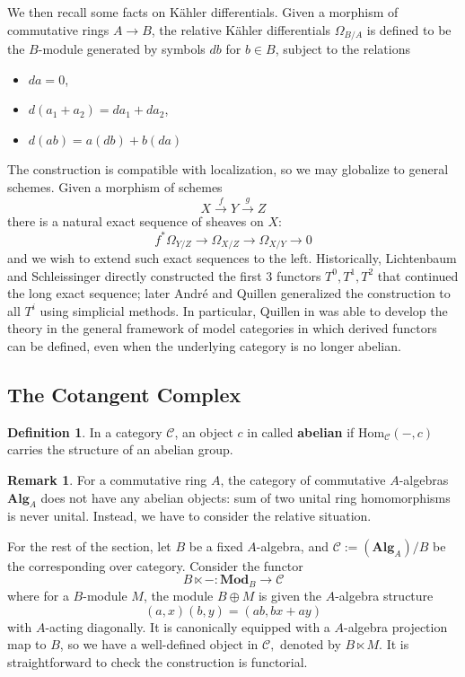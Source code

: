 \documentclass{article}
\newcommand{\Hom}{\textrm{Hom}}
\theoremstyle{definition}
\theoremstyle{definition}
\newtheorem{definition}{Definition}[theorem]
\theoremstyle{definition}
\newtheorem{remark}{Remark}[theorem]
\theoremstyle{definition}
\theoremstyle{definition}
\theoremstyle{definition}
\theoremstyle{definition}
\begin{document}
We then recall some facts on K\"ahler differentials. Given a morphism of commutative rings $A\to B$, the relative K\"ahler differentials $\Omega_{B/A}$ is defined to be the $B$-module generated by symbols $db$ for $b\in B$, subject to the relations
\begin{itemize}
	\item $da=0$,
	\item $d(a_1+a_2)=da_1+da_2$,
	\item $d(ab)=a (db)+b(da)$
\end{itemize}
The construction is compatible with localization, so we may globalize to general schemes. Given a morphism of schemes 
\[X\xrightarrow{f} Y\xrightarrow{g} Z\]
there is a natural exact sequence of sheaves on $X$:
\[f^*\Omega_{Y/Z}\to \Omega_{X/Z}\to \Omega_{X/Y}\to 0\]
and we wish to extend such exact sequences to the left. Historically, Lichtenbaum and Schleissinger directly constructed the first $3$ functors $T^0,T^1,T^2$ that continued the long exact sequence; later Andr\'e and Quillen generalized the construction to all $T^i$ using simplicial methods. In particular, Quillen in \cite{Quillen} was able to develop the theory in the general framework of model categories in which derived functors can be defined, even when the underlying category is no longer abelian.





\subsection{The Cotangent Complex}
\begin{definition}
	In a category $\mathcal{C}$, an object $c$ in called \textbf{abelian} if $\Hom_{\mathcal{C}}(-, c)$ carries the structure of an abelian group.
\end{definition}

\begin{remark}
	For a commutative ring $A$, the category of commutative $A$-algebras $\textbf{Alg}_A$ does not have any abelian objects: sum of two unital ring homomorphisms is never unital. Instead, we have to consider the relative situation.  
\end{remark}
For the rest of the section, let $B$ be a fixed $A$-algebra, and $\mathcal{C}:=(\textbf{Alg}_A)/B$ be the corresponding over category. Consider the functor 
	\[B\ltimes -: \textbf{Mod}_B\to \mathcal{C}\]
where for a $B$-module $M$, the module $B\oplus M$ is given the $A$-algebra structure
\[(a,x)(b,y)=(ab,bx+ay)\]
with $A$-acting diagonally. It is canonically equipped with a $A$-algebra projection map to $B$, so we have a well-defined object in $\mathcal{C},$ denoted by $B\ltimes M$. It is straightforward to check the construction is functorial. 
\end{document}
